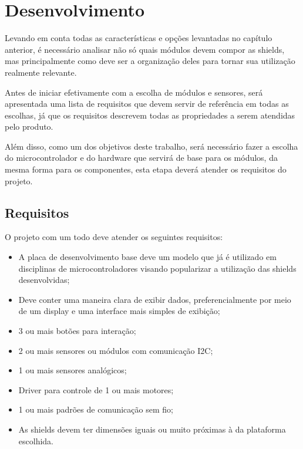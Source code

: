 \chapter{Desenvolvimento}

Levando em conta todas as características e opções levantadas no capítulo anterior, é necessário analisar não só quais módulos devem compor as shields, mas principalmente como deve ser a  organização deles para tornar sua utilização realmente relevante.

Antes de iniciar efetivamente com a escolha de módulos e sensores, será apresentada uma lista de requisitos que devem servir de referência em todas as escolhas, já que os requisitos descrevem todas as propriedades a serem atendidas pelo produto.

Além disso, como um dos objetivos deste trabalho, será necessário fazer a escolha do microcontrolador e do hardware que servirá de base para os módulos, da mesma forma para os componentes, esta etapa deverá atender os requisitos do projeto.



\section{Requisitos}

O projeto com um todo deve atender os seguintes requisitos:

\begin{itemize}
	\item A placa de desenvolvimento base deve um modelo que já é utilizado em disciplinas de microcontroladores visando popularizar a utilização das shields desenvolvidas;
	\item Deve conter uma maneira clara de exibir dados, preferencialmente por meio de um display e uma interface mais simples de exibição;
	\item 3 ou mais botões para interação;
	\item 2 ou mais sensores ou módulos com comunicação I2C;
	\item 1 ou mais sensores analógicos;
	\item Driver para controle de 1 ou mais motores;
	\item 1 ou mais padrões de comunicação sem fio;
	\item As shields devem ter dimensões iguais ou muito próximas à da plataforma escolhida.
	
\end{itemize} 


